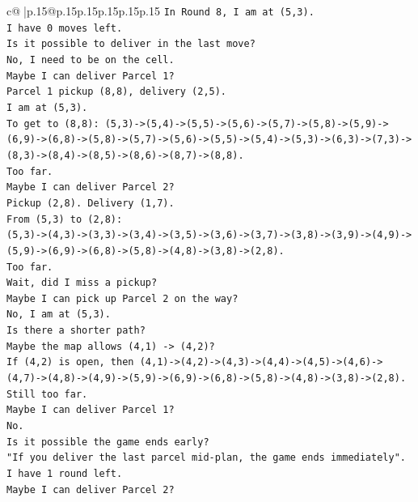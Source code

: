 \documentclass{article}
\begin{document}
{\begin{supertabular}{c@{$\;$}|p{.15\linewidth}@{}p{.15\linewidth}p{.15\linewidth}p{.15\linewidth}p{.15\linewidth}p{.15\linewidth}}
{{{\texttt{In Round 8, I am at (5,3).} \\
\texttt{I have 0 moves left.} \\
\texttt{Is it possible to deliver in the last move?} \\
\texttt{No, I need to be on the cell.} \\
\texttt{Maybe I can deliver Parcel 1?} \\
\texttt{Parcel 1 pickup (8,8), delivery (2,5).} \\
\texttt{I am at (5,3).} \\
\texttt{To get to (8,8): (5,3){-}>(5,4){-}>(5,5){-}>(5,6){-}>(5,7){-}>(5,8){-}>(5,9){-}>(6,9){-}>(6,8){-}>(5,8){-}>(5,7){-}>(5,6){-}>(5,5){-}>(5,4){-}>(5,3){-}>(6,3){-}>(7,3){-}>(8,3){-}>(8,4){-}>(8,5){-}>(8,6){-}>(8,7){-}>(8,8).} \\
\texttt{Too far.} \\
\texttt{Maybe I can deliver Parcel 2?} \\
\texttt{Pickup (2,8). Delivery (1,7).} \\
\texttt{From (5,3) to (2,8):} \\
\texttt{(5,3){-}>(4,3){-}>(3,3){-}>(3,4){-}>(3,5){-}>(3,6){-}>(3,7){-}>(3,8){-}>(3,9){-}>(4,9){-}>(5,9){-}>(6,9){-}>(6,8){-}>(5,8){-}>(4,8){-}>(3,8){-}>(2,8).} \\
\texttt{Too far.} \\
\texttt{Wait, did I miss a pickup?} \\
\texttt{Maybe I can pick up Parcel 2 on the way?} \\
\texttt{No, I am at (5,3).} \\
\texttt{Is there a shorter path?} \\
\texttt{Maybe the map allows (4,1) {-}> (4,2)?} \\
\texttt{If (4,2) is open, then (4,1){-}>(4,2){-}>(4,3){-}>(4,4){-}>(4,5){-}>(4,6){-}>(4,7){-}>(4,8){-}>(4,9){-}>(5,9){-}>(6,9){-}>(6,8){-}>(5,8){-}>(4,8){-}>(3,8){-}>(2,8).} \\
\texttt{Still too far.} \\
\texttt{Maybe I can deliver Parcel 1?} \\
\texttt{No.} \\
\texttt{Is it possible the game ends early?} \\
\texttt{"If you deliver the last parcel mid{-}plan, the game ends immediately".} \\
\texttt{I have 1 round left.} \\
\texttt{Maybe I can deliver Parcel 2?} \\
}}}
\end{supertabular}}
\end{document}
